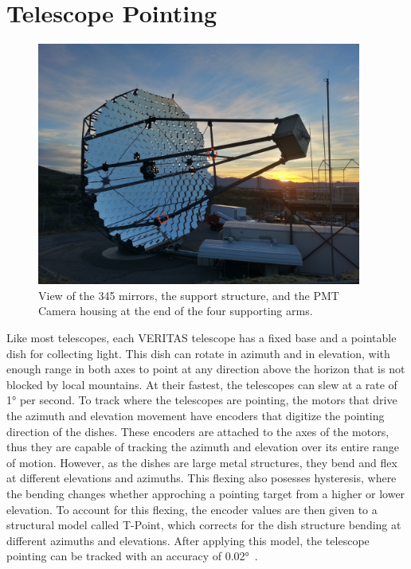 \section{Telescope Pointing}\label{sec:telpoint}

\begin{figure}[ht]
  \centering
  \includegraphics[width=0.95\textwidth]{images/single_telescope}
  \caption[Single Veritas Telescope]{
    View of the 345 mirrors, the support structure, and the PMT Camera housing at the end of the four supporting arms.}
  \label{fig:davcottel}
\end{figure}

Like most telescopes, each VERITAS telescope has a fixed base and a pointable dish for collecting light.
This dish can rotate in azimuth and in elevation, with enough range in both axes to point at any direction above the horizon that is not blocked by local mountains.
At their fastest, the telescopes can slew at a rate of \nicetilde{}\ang{1} per second.
To track where the telescopes are pointing, the motors that drive the azimuth and elevation movement have encoders that digitize the pointing direction of the dishes.
These encoders are attached to the axes of the motors, thus they are capable of tracking the azimuth and elevation over its entire range of motion.
However, as the dishes are large metal structures, they bend and flex at different elevations and azimuths.
This flexing also posesses hysteresis, where the bending changes whether approching a pointing target from a higher or lower elevation.
To account for this flexing, the encoder values are then given to a structural model called T-Point, which corrects for the dish structure bending at different azimuths and elevations.
After applying this model, the telescope pointing can be tracked with an accuracy of \nicetilde{}\ang{0.02}~\cite{holder2008status}.


